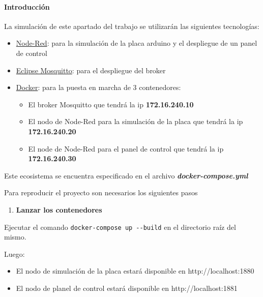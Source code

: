 \documentclass[11pt]{extarticle}
\providecommand{\tightlist}{%
      \setlength{\itemsep}{0pt}\setlength{\parskip}{0pt}}
\begin{document}
    \hypertarget{introducciuxf3n}{%
\paragraph{Introducción}\label{introducciuxf3n}}

La simulación de este apartado del trabajo se utilizarán las siguientes
tecnologías:

\begin{itemize}
\item
  \href{https://nodered.org/}{Node-Red}: para la simulación de la placa
  arduino y el despliegue de un panel de control
\item
  \href{https://mosquitto.org/}{Eclipse Mosquitto}: para el despliegue
  del broker
\item
  \href{https://www.docker.com/}{Docker}: para la puesta en marcha de 3
  contenedores:

  \begin{itemize}
  \item
    El broker Mosquitto que tendrá la ip \textbf{172.16.240.10}
  \item
    El nodo de Node-Red para la simulación de la placa que tendrá la ip
    \textbf{172.16.240.20}
  \item
    El node de Node-Red para el panel de control que tendrá la ip
    \textbf{172.16.240.30}
  \end{itemize}
\end{itemize}

Este ecosistema se encuentra especificado en el archivo
\textbf{\emph{docker-compose.yml}}

Para reproducir el proyecto son necesarios los siguientes pasos

\begin{enumerate}
\def\labelenumi{\arabic{enumi})}
\tightlist
\item
  \textbf{Lanzar los contenedores}
\end{enumerate}

Ejecutar el comando \texttt{docker-compose\ up\ -\/-build} en el
directorio raíz del mismo.

Luego:

\begin{itemize}
\item
  El nodo de simulación de la placa estará disponible en
  http://localhost:1880
\item
  El nodo de planel de control estará disponible en
  http://localhost:1881
\end{itemize}
\end{document}
